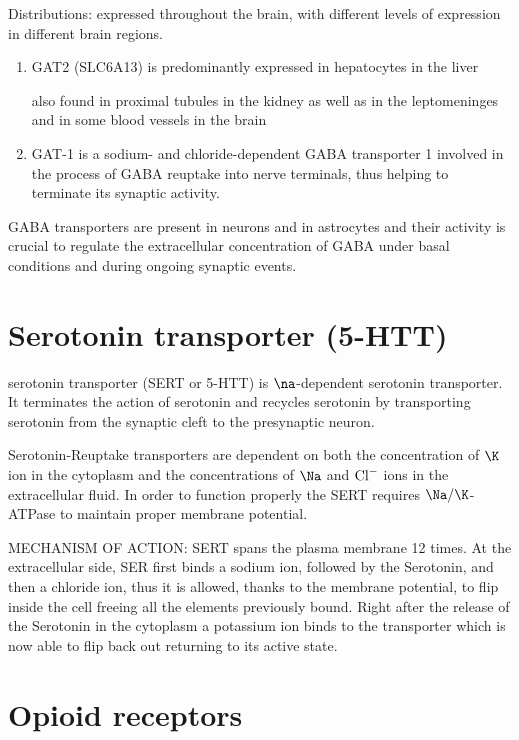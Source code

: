 Distributions: expressed throughout the brain, with different levels of
expression in different brain regions.
\begin{enumerate}
  \item  GAT2 (SLC6A13) is predominantly expressed in hepatocytes in the liver
  
  also found in proximal tubules in the kidney as well as in the leptomeninges
  and in some blood vessels in the brain
  
  \item GAT-1 is  a sodium- and chloride-dependent GABA transporter 1 involved
  in the process of GABA reuptake into nerve terminals, thus helping to
  terminate its synaptic activity. 
  
\end{enumerate}

GABA transporters are present in neurons and in astrocytes and their activity is
crucial to regulate the extracellular concentration of GABA under basal
conditions and during ongoing synaptic events.

\section{Serotonin transporter (5-HTT)}
\label{sec:serotonin-transporter}

serotonin transporter (SERT or 5-HTT) is $\na$-dependent serotonin transporter.
It terminates the action of serotonin and recycles serotonin by transporting
serotonin from the synaptic cleft to the presynaptic neuron.

Serotonin-Reuptake transporters are dependent on both the concentration of
$\K$ ion in the cytoplasm and the concentrations of $\Na$ and ${\text{Cl}^{-}}$
ions in the extracellular fluid.
In order to function properly the SERT requires $\Na/\K$-ATPase to maintain
proper membrane potential.

MECHANISM OF ACTION: SERT spans the plasma membrane 12 times. At the
extracellular side, SER first binds a sodium ion, followed by the Serotonin, and
then a chloride ion, thus it is allowed, thanks to the membrane potential, to
flip inside the cell freeing all the elements previously bound. Right after the
release of the Serotonin in the cytoplasm a potassium ion binds to the
transporter which is now able to flip back out returning to its active state.




\section{Opioid receptors}
\label{sec:opiate-receptor}
\label{sec:opioid-receptors}

